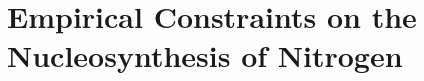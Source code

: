 \documentclass[../main.tex]{subfiles}
\begin{document}
\chapter{Empirical Constraints on the Nucleosynthesis of Nitrogen}
\label{ohno}






\end{document}
